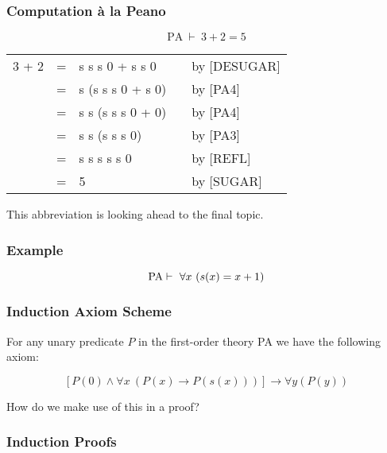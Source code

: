 \documentclass{beamer}
\theoremstyle{indentDefn} \newtheorem{defn}[]{Definition}
\begin{document}
\begin{frame}
	\frametitle{Computation \`{a} la Peano}

	$$ \text{PA} \ \vdash \ 3 + 2 = 5$$

	\begin{tabular}{r c l c l}
		3 + 2 & = & s s s 0 + s s 0   & & by [DESUGAR] \\
		      & = & s (s s s 0 + s 0) & & by [PA4] \\
			  & = & s s (s s s 0 + 0) & & by [PA4] \\
			  & = & s s (s s s 0)	  & & by [PA3] \\
			  & = & s s s s s 0		  & & by [REFL] \\
			  & = & 5				  & & by [SUGAR]
	\end{tabular}



	\vspace{3cm}

	This abbreviation is looking ahead to the final topic. 
\end{frame}

\begin{frame}
	\frametitle{Example}

	$$ \text{PA} \vdash \ \forall x \ (s(x) = x + 1)$$

	\vspace{6.5cm}

\end{frame}

\begin{frame}
	\frametitle{Induction Axiom Scheme}

	For any unary predicate $P$ in the first-order theory PA we have the following axiom: 

	$$[P(0) \land \forall x \ (P(x) \to P(s(x)))] \rightarrow \forall y (P(y))$$

	How do we make use of this in a proof? 

	\vspace{4cm}

\end{frame}

\begin{frame}
	\frametitle{Induction Proofs}


\end{frame}
\end{document}

